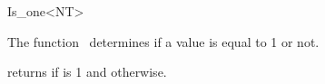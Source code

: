 \begin{ccRefFunctionObjectClass}{Is_one<NT>}

\ccDefinition

The function \ccRefName\ determines if a value is equal to 1 or not.


\ccIsModel
{}

{returns  if  is 1 and  otherwise.}

\end{ccRefFunctionObjectClass}
